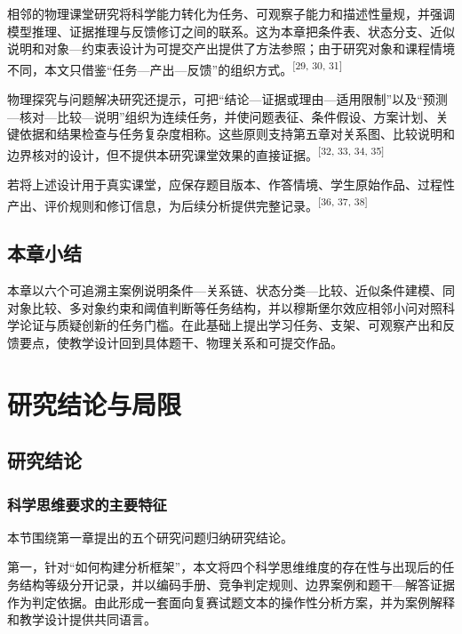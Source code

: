 \documentclass[
  12pt,
  a4paper,twoside,openany]{ctexbook}
\begin{document}
相邻的物理课堂研究将科学能力转化为任务、可观察子能力和描述性量规，并强调模型推理、证据推理与反馈修订之间的联系。这为本章把条件表、状态分支、近似说明和对象---约束表设计为可提交产出提供了方法参照；由于研究对象和课程情境不同，本文只借鉴``任务---产出---反馈''的组织方式。\textsuperscript{[29, 30, 31]}

物理探究与问题解决研究还提示，可把``结论---证据或理由---适用限制''以及``预测---核对---比较---说明''组织为连续任务，并使问题表征、条件假设、方案计划、关键依据和结果检查与任务复杂度相称。这些原则支持第五章对关系图、比较说明和边界核对的设计，但不提供本研究课堂效果的直接证据。\textsuperscript{[32, 33, 34, 35]}

若将上述设计用于真实课堂，应保存题目版本、作答情境、学生原始作品、过程性产出、评价规则和修订信息，为后续分析提供完整记录。\textsuperscript{[36, 37, 38]}

\section{本章小结}\label{ux672cux7ae0ux5c0fux7ed3-3}

\enlargethispage{2\baselineskip}

本章以六个可追溯主案例说明条件---关系链、状态分类---比较、近似条件建模、同对象比较、多对象约束和阈值判断等任务结构，并以穆斯堡尔效应相邻小问对照科学论证与质疑创新的任务门槛。在此基础上提出学习任务、支架、可观察产出和反馈要点，使教学设计回到具体题干、物理关系和可提交作品。

\chapter{研究结论与局限}\label{ux7814ux7a76ux7ed3ux8bbaux4e0eux5c40ux9650}

\section{研究结论}\label{ux7814ux7a76ux7ed3ux8bba}

\subsection{科学思维要求的主要特征}\label{ux79d1ux5b66ux601dux7ef4ux8981ux6c42ux7684ux4e3bux8981ux7279ux5f81}

本节围绕第一章提出的五个研究问题归纳研究结论。

第一，针对``如何构建分析框架''，本文将四个科学思维维度的存在性与出现后的任务结构等级分开记录，并以编码手册、竞争判定规则、边界案例和题干---解答证据作为判定依据。由此形成一套面向复赛试题文本的操作性分析方案，并为案例解释和教学设计提供共同语言。
\end{document}
